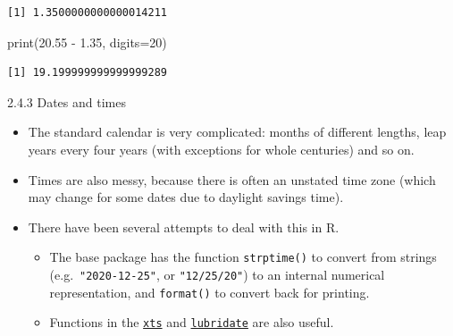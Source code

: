 \documentclass[
  9pt,
  a4paper,
  ignorenonframetext,
  notheorems]{beamer}
\newenvironment{Shaded}{\begin{snugshade}}{\end{snugshade}}
\newcommand{\AttributeTok}[1]{\textcolor[rgb]{0.40,0.45,0.13}{#1}}
\newcommand{\DecValTok}[1]{\textcolor[rgb]{0.68,0.00,0.00}{#1}}
\newcommand{\FloatTok}[1]{\textcolor[rgb]{0.68,0.00,0.00}{#1}}
\newcommand{\FunctionTok}[1]{\textcolor[rgb]{0.28,0.35,0.67}{#1}}
\newcommand{\NormalTok}[1]{\textcolor[rgb]{0.00,0.23,0.31}{#1}}
\newcommand{\SpecialCharTok}[1]{\textcolor[rgb]{0.37,0.37,0.37}{#1}}
\providecommand{\tightlist}{%
  \setlength{\itemsep}{0pt}\setlength{\parskip}{0pt}}\usepackage{longtable,booktabs,array}
\begin{document}
\begin{frame}[fragile]
\begin{verbatim}
[1] 1.3500000000000014211
\end{verbatim}

\begin{Shaded}
\begin{Highlighting}[]
\FunctionTok{print}\NormalTok{(}\FloatTok{20.55} \SpecialCharTok{{-}} \FloatTok{1.35}\NormalTok{, }\AttributeTok{digits=}\DecValTok{20}\NormalTok{)}
\end{Highlighting}
\end{Shaded}

\begin{verbatim}
[1] 19.199999999999999289
\end{verbatim}
\end{frame}

\begin{frame}[fragile]{2.4.3 Dates and times}
\protect\hypertarget{dates-and-times}{}
\begin{itemize}
\tightlist
\item
  The standard calendar is very complicated: months of different
  lengths, leap years every four years (with exceptions for whole
  centuries) and so on.
\end{itemize}

\begin{itemize}
\tightlist
\item
  Times are also messy, because there is often an unstated time zone
  (which may change for some dates due to daylight savings time).
\end{itemize}

\begin{itemize}
\tightlist
\item
  There have been several attempts to deal with this in R.

  \begin{itemize}
  \tightlist
  \item
    The base package has the function \texttt{strptime()} to convert
    from strings (e.g.~\texttt{"2020-12-25"}, or \texttt{"12/25/20"}) to
    an internal numerical representation, and \texttt{format()} to
    convert back for printing.
  \item
    Functions in the
    \href{https://github.com/joshuaulrich/xts}{\texttt{xts}} and
    \href{https://lubridate.tidyverse.org}{\texttt{lubridate}} are also
    useful.
  \end{itemize}
\end{itemize}
\end{frame}
\end{document}
